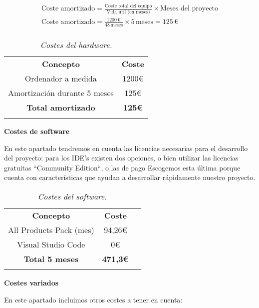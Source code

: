 \begin{gather*}
    \text{Coste amortizado} = \frac{\text{Coste total del equipo}}{\text{Vida útil (en meses)}} \times \text{Meses del proyecto}\\
    \text{Coste amortizado} = \frac{1200\,€}{48\,\text{meses}} \times 5\,\text{meses} = 125\,€\\
\end{gather*}

\begin{table}[H]
    \centering
    \begin{tabular}{| c | c |}
        \Xhline{2\arrayrulewidth}
        \textbf{Concepto} & \textbf{Coste} \\ \Xhline{2\arrayrulewidth}
        Ordenador a medida & 1200€ \\ \hline
        Amortización durante 5 meses & 125€ \\ \hline
        \Xhline{2\arrayrulewidth}
        \textbf{Total amortizado} & \textbf{125€} \\ \Xhline{2\arrayrulewidth}
    \end{tabular}
    \caption{\textit{Costes del hardware.}}
\end{table}
\textbf{Costes de software}

En este apartado tendremos en cuenta las licencias necesarias para el desarrollo del proyecto: para los IDE's existen
dos opciones, o bien utilizar las licencias gratuitas ``Community Edition``, o las de pago\cite{jetbrainsPrecios}
Escogemos esta última porque cuenta con características que ayudan a desarrollar rápidamente nuestro proyecto.

\begin{table}[H]
    \centering
    \begin{tabular}{| c | c | c |}\hline
        \Xhline{2\arrayrulewidth}
        \textbf{Concepto} & \textbf{Coste} \\ \Xhline{2\arrayrulewidth}
        All Products Pack (mes) & 94,26€ \\ \hline
        Visual Studio Code & 0€ \\ \hline
        \Xhline{2\arrayrulewidth}
        \textbf{Total 5 meses} & \textbf{471,3€} \\ \Xhline{2\arrayrulewidth}
    \end{tabular}
    \caption{\textit{Costes del software.}}
\end{table}

\textbf{Costes variados}

En este apartado incluimos otros costes a tener en cuenta:


